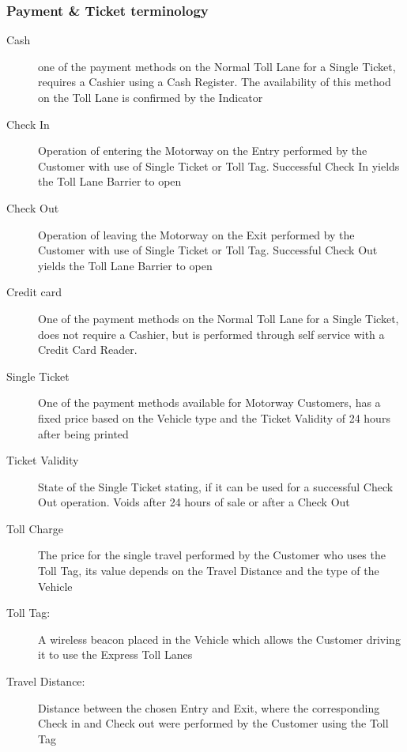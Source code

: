 \subsubsection{Payment \& Ticket terminology}
\begin{description}
  \item[Cash] one of the payment methods on the Normal Toll Lane for a Single Ticket, requires a Cashier using a Cash Register. The availability of this method on the Toll Lane is confirmed by the Indicator
  \item[Check In] Operation of entering the Motorway on the Entry performed by the Customer with use of Single Ticket or Toll Tag. Successful Check In yields the Toll Lane Barrier to open
  \item[Check Out] Operation of leaving the Motorway on the Exit performed by the Customer with use of Single Ticket or Toll Tag. Successful Check Out yields the Toll Lane Barrier to open
  \item[Credit card] One of the payment methods on the Normal Toll Lane for a Single Ticket, does not require a Cashier, but is performed through self service with a Credit Card Reader.
  \item[Single Ticket] One of the payment methods available for Motorway Customers, has a fixed price based on the Vehicle type and the Ticket Validity of 24 hours after being printed
  \item[Ticket Validity] State of the Single Ticket stating, if it can be used for a successful Check Out operation. Voids after 24 hours of sale or after a Check Out
  \item[Toll Charge] The price for the single travel performed by the Customer who uses the Toll Tag, its value depends on the Travel Distance and the type of the Vehicle
  \item[Toll Tag:] A wireless beacon placed in the Vehicle which allows the Customer driving it to use the Express Toll Lanes
  \item[Travel Distance:] Distance between the chosen Entry and Exit, where the corresponding Check in and Check out were performed by the Customer using the Toll Tag
\end{description}

